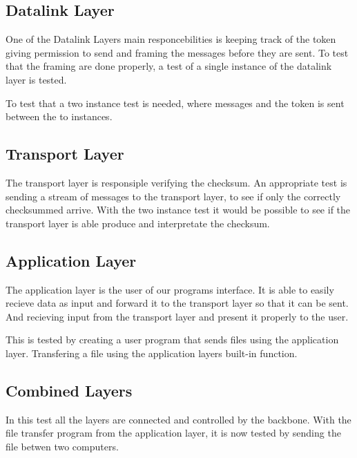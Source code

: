 \subsection{Datalink Layer}


One of the Datalink Layers main responcebilities is keeping track of the token giving permission to send and framing the messages before they are sent.
To test that the framing are done properly, a test of a single instance of the datalink layer is tested.

 To test that a two instance test is needed, where messages and the token is sent between the to instances. 


\subsection{Transport Layer}

The transport layer is responsiple verifying the checksum. An appropriate test is sending a stream of messages to the transport layer, to see if only the correctly checksummed arrive. With the two instance test it would be possible to see if the transport layer is able produce and interpretate the checksum.

\subsection{Application Layer}

The application layer is the user of our programs interface. It is able to easily recieve data as input and forward it to the transport layer  so that it can be sent. And recieving input from the transport layer and present it properly to the user.


This is tested by creating a user program that sends files using the application layer. Transfering a file using the application layers built-in function. 

\subsection{Combined Layers}

In this test all the layers are connected and controlled by the backbone. With the file transfer program from the application layer, it is now tested by sending the file betwen two computers.